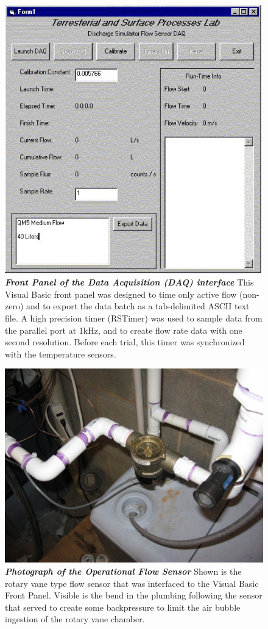 \begin{figure}[ht!]
 \centering\includegraphics[scale=.65]{frontpanel.jpg}
 \caption[Front Panel Screen]{\textbf{\emph{Front Panel of the Data Acquisition (DAQ) interface}} This Visual Basic front panel was designed to time only active flow (non-zero) and to export the data batch as a tab-delimited ASCII text file. A high precision timer (RSTimer) was used to sample data from the parallel port at 1kHz, and to create flow rate data with one second resolution. Before each trial, this timer was synchronized with the temperature sensors.\label{frontpanel}}
\end{figure}

\begin{figure}[ht!]
 \centering\includegraphics[scale=.25]{flowsens.jpg}
 \caption[Flow Sensor]{\textbf{\emph{Photograph of the Operational Flow Sensor}}\label{flowsenser} Shown is the rotary vane type flow sensor that was interfaced to the Visual Basic Front Panel. Visible is the bend in the plumbing following the sensor that served to create some backpressure to limit the air bubble ingestion of the rotary vane chamber.}
\end{figure}
\pagebreak
